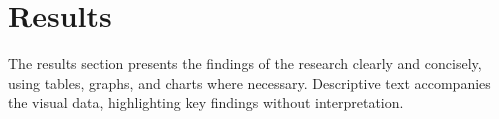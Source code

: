 \section{Results}
\label{section:results}
The results section presents the findings of the research clearly and concisely, using tables, graphs, and charts where necessary. Descriptive text accompanies the visual data, highlighting key findings without interpretation.



